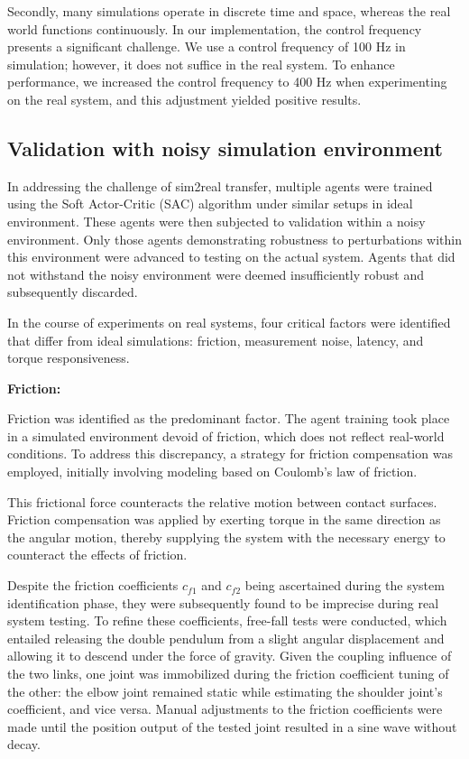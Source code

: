 Secondly, many simulations operate in discrete time and space, whereas the real world functions continuously. In our implementation, the control frequency presents a significant challenge. We use a control frequency of 100 Hz in simulation; however, it does not suffice in the real system. To enhance performance, we increased the control frequency to 400 Hz when experimenting on the real system, and this adjustment yielded positive results.

\subsection{Validation with noisy simulation environment}
In addressing the challenge of sim2real transfer, multiple agents were trained using the Soft Actor-Critic (SAC) algorithm under similar setups in ideal environment. These agents were then subjected to validation within a noisy environment. Only those agents demonstrating robustness to perturbations within this environment were advanced to testing on the actual system. Agents that did not withstand the noisy environment were deemed insufficiently robust and subsequently discarded.

In the course of experiments on real systems, four critical factors were identified that differ from ideal simulations: friction, measurement noise, latency, and torque responsiveness.

\textbf{Friction:}

Friction was identified as the predominant factor. The agent training took place in a simulated environment devoid of friction, which does not reflect real-world conditions. To address this discrepancy, a strategy for friction compensation was employed, initially involving modeling based on Coulomb’s law of friction.

This frictional force counteracts the relative motion between contact surfaces. Friction compensation was applied by exerting torque in the same direction as the angular motion, thereby supplying the system with the necessary energy to counteract the effects of friction.

Despite the friction coefficients \(c_{f1}\) and \(c_{f2}\) being ascertained during the system identification phase, they were subsequently found to be imprecise during real system testing. To refine these coefficients, free-fall tests were conducted, which entailed releasing the double pendulum from a slight angular displacement and allowing it to descend under the force of gravity. Given the coupling influence of the two links, one joint was immobilized during the friction coefficient tuning of the other: the elbow joint remained static while estimating the shoulder joint's coefficient, and vice versa. Manual adjustments to the friction coefficients were made until the position output of the tested joint resulted in a sine wave without decay.

